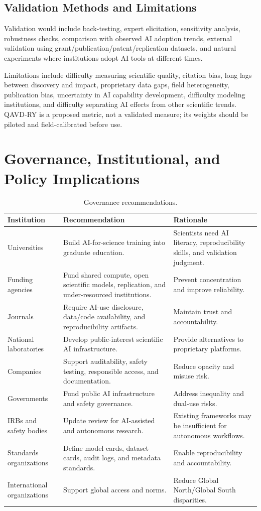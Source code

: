 \documentclass[12pt]{article}
\begin{document}
\subsection{Validation Methods and Limitations}

Validation would include back-testing, expert elicitation, sensitivity analysis, robustness checks, comparison with observed AI adoption trends, external validation using grant/publication/patent/replication datasets, and natural experiments where institutions adopt AI tools at different times.

Limitations include difficulty measuring scientific quality, citation bias, long lags between discovery and impact, proprietary data gaps, field heterogeneity, publication bias, uncertainty in AI capability development, difficulty modeling institutions, and difficulty separating AI effects from other scientific trends. QAVD-RY is a proposed metric, not a validated measure; its weights should be piloted and field-calibrated before use.

\section{Governance, Institutional, and Policy Implications}

\begin{table}[H]
\centering
\caption{Governance recommendations.}
\small
\begin{tabularx}{\textwidth}{p{3.0cm}X X}
\toprule
\textbf{Institution} & \textbf{Recommendation} & \textbf{Rationale} \\
\midrule
Universities & Build AI-for-science training into graduate education. & Scientists need AI literacy, reproducibility skills, and validation judgment. \\
Funding agencies & Fund shared compute, open scientific models, replication, and under-resourced institutions. & Prevent concentration and improve reliability. \\
Journals & Require AI-use disclosure, data/code availability, and reproducibility artifacts. & Maintain trust and accountability. \\
National laboratories & Develop public-interest scientific AI infrastructure. & Provide alternatives to proprietary platforms. \\
Companies & Support auditability, safety testing, responsible access, and documentation. & Reduce opacity and misuse risk. \\
Governments & Fund public AI infrastructure and safety governance. & Address inequality and dual-use risks. \\
IRBs and safety bodies & Update review for AI-assisted and autonomous research. & Existing frameworks may be insufficient for autonomous workflows. \\
Standards organizations & Define model cards, dataset cards, audit logs, and metadata standards. & Enable reproducibility and accountability. \\
International organizations & Support global access and norms. & Reduce Global North/Global South disparities. \\
\bottomrule
\end{tabularx}
\end{table}
\end{document}
